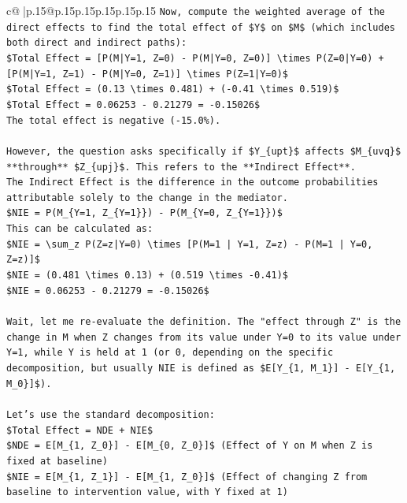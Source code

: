 \documentclass{article}
\begin{document}
{\begin{supertabular}{c@{$\;$}|p{.15\linewidth}@{}p{.15\linewidth}p{.15\linewidth}p{.15\linewidth}p{.15\linewidth}p{.15\linewidth}}
{{{\texttt{Now, compute the weighted average of the direct effects to find the total effect of \$Y\$ on \$M\$ (which includes both direct and indirect paths):} \\
\texttt{\$Total Effect = {[}P(M|Y=1, Z=0) {-} P(M|Y=0, Z=0){]} \textbackslash{}times P(Z=0|Y=0) + {[}P(M|Y=1, Z=1) {-} P(M|Y=0, Z=1){]} \textbackslash{}times P(Z=1|Y=0)\$} \\
\texttt{\$Total Effect = (0.13 \textbackslash{}times 0.481) + ({-}0.41 \textbackslash{}times 0.519)\$} \\
\texttt{\$Total Effect = 0.06253 {-} 0.21279 = {-}0.15026\$} \\
\texttt{The total effect is negative ({-}15.0\%).} \\
\\ 
\texttt{However, the question asks specifically if \$Y\_\{upt\}\$ affects \$M\_\{uvq\}\$ **through** \$Z\_\{upj\}\$. This refers to the **Indirect Effect**.} \\
\texttt{The Indirect Effect is the difference in the outcome probabilities attributable solely to the change in the mediator.} \\
\texttt{\$NIE = P(M\_\{Y=1, Z\_\{Y=1\}\}) {-} P(M\_\{Y=0, Z\_\{Y=1\}\})\$} \\
\texttt{This can be calculated as:} \\
\texttt{\$NIE = \textbackslash{}sum\_z P(Z=z|Y=0) \textbackslash{}times {[}P(M=1 | Y=1, Z=z) {-} P(M=1 | Y=0, Z=z){]}\$} \\
\texttt{\$NIE = (0.481 \textbackslash{}times 0.13) + (0.519 \textbackslash{}times {-}0.41)\$} \\
\texttt{\$NIE = 0.06253 {-} 0.21279 = {-}0.15026\$} \\
\\ 
\texttt{Wait, let me re{-}evaluate the definition. The "effect through Z" is the change in M when Z changes from its value under Y=0 to its value under Y=1, while Y is held at 1 (or 0, depending on the specific decomposition, but usually NIE is defined as \$E{[}Y\_\{1, M\_1\}{]} {-} E{[}Y\_\{1, M\_0\}{]}\$).} \\
\\ 
\texttt{Let's use the standard decomposition:} \\
\texttt{\$Total Effect = NDE + NIE\$} \\
\texttt{\$NDE = E{[}M\_\{1, Z\_0\}{]} {-} E{[}M\_\{0, Z\_0\}{]}\$ (Effect of Y on M when Z is fixed at baseline)} \\
\texttt{\$NIE = E{[}M\_\{1, Z\_1\}{]} {-} E{[}M\_\{1, Z\_0\}{]}\$ (Effect of changing Z from baseline to intervention value, with Y fixed at 1)} \\
}}}
\end{supertabular}}
\end{document}
